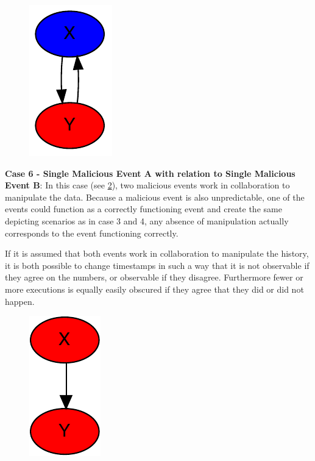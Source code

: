 	\begin{figure}[H]
		\centering
		\includegraphics[]{5validation/images/6.pdf}
		\caption{}
		\label{fig:consensus:single-good-with-twoway-malicious-relation}
	\end{figure}
	
	\newpar \textbf{Case 6 - Single Malicious Event A with relation to Single Malicious Event B}: In this case (see \ref{fig:consensus:single-malicious-with-twoway-malicious-relation}), two malicious events work in collaboration to manipulate the data. Because a malicious event is also unpredictable, one of the events could function as a correctly functioning event and create the same depicting scenarios as in case 3 and 4, any absence of manipulation actually corresponds to the event functioning correctly.
	
	If it is assumed that both events work in collaboration to manipulate the history, it is both possible to change timestamps in such a way that it is not observable if they agree on the numbers, or observable if they disagree. Furthermore fewer or more executions is equally easily obscured if they agree that they did or did not happen.
	
	\begin{figure}[H]
		\centering
		\includegraphics[]{5validation/images/4.pdf}
		\caption{}
		\label{fig:consensus:single-malicious-with-twoway-malicious-relation}
	\end{figure}
	

